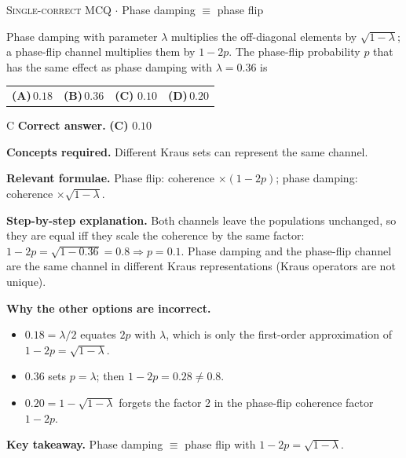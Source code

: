 \documentclass[11pt,a4paper]{article}
\newcommand{\optlabel}[1]{\textbf{(#1)}}
\newcommand{\correctlabel}[1]{\textcolor{okgreen}{\textbf{(#1)}\,\ding{51}}}
\newenvironment{qitem}[1]{\begin{list}{}{\setlength{\leftmargin}{3.3em}\setlength{\labelwidth}{3.1em}%
  \setlength{\labelsep}{0.2em}\setlength{\topsep}{3pt}\setlength{\parsep}{3pt}}\item[\textbf{Q.#1}\hfill]}{\end{list}}
\newcommand{\qsep}{\par\vspace{2pt}{\color{black!15}\hrule}\vspace{4pt}}
\newcommand{\qmeta}[2]{{\footnotesize\color{black!60}\textsc{#1} \;$\cdot$\; #2}\par}
\begin{document}
\begin{qitem}{25}
\qmeta{Single-correct MCQ}{Phase damping $\equiv$ phase flip}
Phase damping with parameter $\lambda$ multiplies the off-diagonal elements by $\sqrt{1 - \lambda}$; a phase-flip channel multiplies them by $1 - 2p$.
The phase-flip probability $p$ that has the same effect as phase damping with $\lambda = 0.36$ is
\par\smallskip\noindent\begin{tabularx}{\linewidth}{@{}*{4}{L}@{}}
\optlabel{A}\,$0.18$ & \optlabel{B}\,$0.36$ & \correctlabel{C}\,$0.10$ & \optlabel{D}\,$0.20$
\end{tabularx}
\end{qitem}
\begin{solbox}{C}
\textbf{\color{brand}Correct answer.} \textcolor{okgreen}{\textbf{(C)}} $0.10$

\textbf{\color{brand}Concepts required.} Different Kraus sets can represent the same channel.

\textbf{\color{brand}Relevant formulae.} Phase flip: coherence $\times(1-2p)$; phase damping: coherence $\times\sqrt{1-\lambda}$.

\textbf{\color{brand}Step-by-step explanation.} Both channels leave the populations unchanged, so they are equal iff they scale the coherence by the same factor:
$1 - 2p = \sqrt{1 - 0.36} = 0.8 \Rightarrow p = 0.1$. Phase damping and the phase-flip channel are the same channel in different Kraus
representations (Kraus operators are not unique).

\textbf{\color{brand}Why the other options are incorrect.}
\begin{itemize}[leftmargin=2.4em, itemsep=1pt, topsep=2pt]
\item[\textbf{(A)}] $0.18 = \lambda/2$ equates $2p$ with $\lambda$, which is only the first-order approximation of $1 - 2p = \sqrt{1-\lambda}$.
\item[\textbf{(B)}] $0.36$ sets $p = \lambda$; then $1 - 2p = 0.28 \neq 0.8$.
\item[\textbf{(D)}] $0.20 = 1 - \sqrt{1 - \lambda}$ forgets the factor 2 in the phase-flip coherence factor $1 - 2p$.
\end{itemize}
\textbf{\color{brand}Key takeaway.} Phase damping $\equiv$ phase flip with $1 - 2p = \sqrt{1-\lambda}$.
\end{solbox}
\qsep
\end{document}
